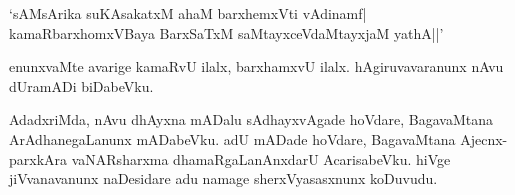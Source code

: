 \begin{shloka}
`sAMsArika suKAsakatxM ahaM barxhemxVti vAdinamf|\\
kamaRbarxhomxV\s Baya BarxSaTxM saMtayxceVdaMtayxjaM yathA||'
\end{shloka}

\noindent enunxvaMte avarige kamaRvU ilalx, barxhamxvU ilalx. hAgiruvavaranunx nAvu dUramADi biDabeVku.

AdadxriMda, nAvu dhAyxna mADalu sAdhayxvAgade hoVdare, BagavaMtana ArAdhanegaLanunx mADabeVku. adU mADade hoVdare, BagavaMtana Ajecnx-parxkAra vaNARsharxma dhamaRgaLanAnxdarU AcarisabeVku. hiVge jiVvanavanunx naDesidare adu namage sherxVyasasxnunx koDuvudu.


\endchapter
